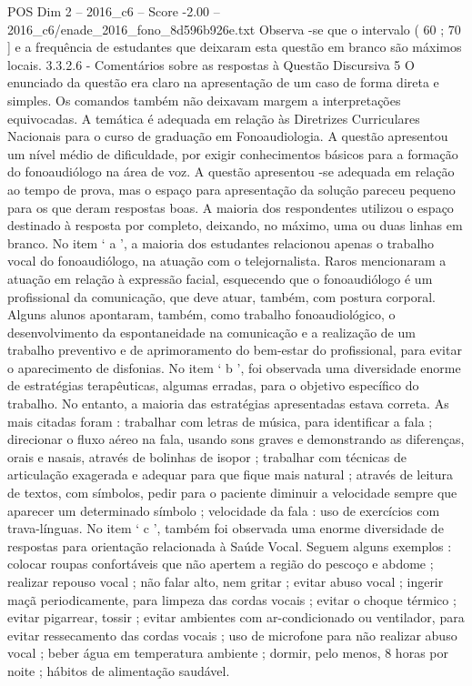 \begin{textsample}{POS Dim 2 – 2016\_c6 – Score -2.00 – 2016\_c6/enade\_2016\_fono\_8d596b926e.txt}
Observa -se que o intervalo ( 60 ; 70 ] e a frequência de estudantes que deixaram esta questão em branco são máximos locais. 3.3.2.6 - Comentários sobre as respostas à Questão Discursiva 5 O enunciado da questão era claro na apresentação de um caso de forma direta e simples.
Os comandos também não deixavam margem a interpretações equivocadas.
A temática é adequada em relação às Diretrizes Curriculares Nacionais para o curso de graduação em Fonoaudiologia.
A questão apresentou um nível médio de dificuldade, por exigir conhecimentos básicos para a formação do fonoaudiólogo na área de voz.
A questão apresentou -se adequada em relação ao tempo de prova, mas o espaço para apresentação da solução pareceu pequeno para os que deram respostas boas.
A maioria dos respondentes utilizou o espaço destinado à resposta por completo, deixando, no máximo, uma ou duas linhas em branco.
No item ‘ a ’, a maioria dos estudantes relacionou apenas o trabalho vocal do fonoaudiólogo, na atuação com o telejornalista.
Raros mencionaram a atuação em relação à expressão facial, esquecendo que o fonoaudiólogo é um profissional da comunicação, que deve atuar, também, com postura corporal.
Alguns alunos apontaram, também, como trabalho fonoaudiológico, o desenvolvimento da espontaneidade na comunicação e a realização de um trabalho preventivo e de aprimoramento do bem-estar do profissional, para evitar o aparecimento de disfonias.
No item ‘ b ’, foi observada uma diversidade enorme de estratégias terapêuticas, algumas erradas, para o objetivo específico do trabalho.
No entanto, a maioria das estratégias apresentadas estava correta.
As mais citadas foram : trabalhar com letras de música, para identificar a fala ; direcionar o fluxo aéreo na fala, usando sons graves e demonstrando as diferenças, orais e nasais, através de bolinhas de isopor ; trabalhar com técnicas de articulação exagerada e adequar para que fique mais natural ; através de leitura de textos, com símbolos, pedir para o paciente diminuir a velocidade sempre que aparecer um determinado símbolo ; velocidade da fala : uso de exercícios com trava-línguas.
No item ‘ c ’, também foi observada uma enorme diversidade de respostas para orientação relacionada à Saúde Vocal.
Seguem alguns exemplos : colocar roupas confortáveis que não apertem a região do pescoço e abdome ; realizar repouso vocal ; não falar alto, nem gritar ; evitar abuso vocal ; ingerir maçã periodicamente, para limpeza das cordas vocais ; evitar o choque térmico ; evitar pigarrear, tossir ; evitar ambientes com ar-condicionado ou ventilador, para evitar ressecamento das cordas vocais ; uso de microfone para não realizar abuso vocal ; beber água em temperatura ambiente ; dormir, pelo menos, 8 horas por noite ; hábitos de alimentação saudável.

\end{textsample}
